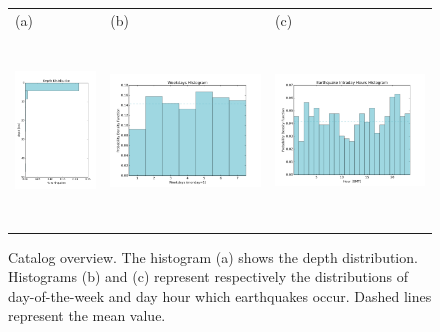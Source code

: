 \documentclass[draft, grl]{agutex}
\begin{document}
\begin{figure}
	\begin{center}
	\begin{table}[H]
		\begin{tabular}{ p{}
						 p{}
						 p{} }
		\footnotesize(a) &
		\footnotesize(b) &
		\footnotesize(c)
		\\
		\includegraphics[height=5cm]{z_img_hmtk_bsb2014_11_depth}  &
		\includegraphics[height=5cm]{z_img_hmtk_bsb2014_11_weekday} &
		\includegraphics[height=5cm]{z_img_hmtk_bsb2014_11_hour}
		\end{tabular}
	\end{table}
	\caption{Catalog overview. The histogram (a) shows the depth distribution. Histograms (b) and (c) represent respectively the distributions of day-of-the-week and day hour which earthquakes occur. Dashed lines represent the mean value.}
	\label{fig_overview}
	\end{center}
\end{figure}
\end{document}
